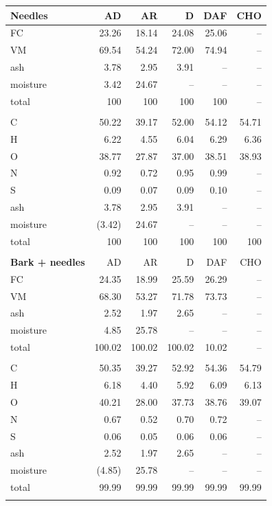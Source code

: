 \begin{center}
\begin{longtable}{lrrrrr}
    \textbf{Needles} & AD & AR & D & DAF & CHO \\
    \midrule
    FC       & 23.26  & 18.14  & 24.08  & 25.06  & -- \\
    VM       & 69.54  & 54.24  & 72.00  & 74.94  & -- \\
    ash      & 3.78   & 2.95   & 3.91   & --     & -- \\
    moisture & 3.42   & 24.67  & --     & --     & -- \\
    total    & 100    & 100    & 100    & 100    & -- \\
    \\
    C        & 50.22  & 39.17  & 52.00  & 54.12  & 54.71 \\
    H        & 6.22   & 4.55   & 6.04   & 6.29   & 6.36 \\
    O        & 38.77  & 27.87  & 37.00  & 38.51  & 38.93 \\
    N        & 0.92   & 0.72   & 0.95   & 0.99   & -- \\
    S        & 0.09   & 0.07   & 0.09   & 0.10   & -- \\
    ash      & 3.78   & 2.95   & 3.91   & --     & -- \\
    moisture & (3.42) & 24.67  & --     & --     & -- \\
    total    & 100    & 100    & 100    & 100    & 100 \\
    \\

    \textbf{Bark + needles} & AD & AR & D & DAF & CHO \\
    \midrule
    FC       & 24.35  & 18.99  & 25.59  & 26.29  & -- \\
    VM       & 68.30  & 53.27  & 71.78  & 73.73  & -- \\
    ash      & 2.52   & 1.97   & 2.65   & --     & -- \\
    moisture & 4.85   & 25.78  & --     & --     & -- \\
    total    & 100.02 & 100.02 & 100.02 & 10.02  & -- \\
    \\
    C        & 50.35  & 39.27  & 52.92  & 54.36  & 54.79 \\
    H        & 6.18   & 4.40   & 5.92   & 6.09   & 6.13 \\
    O        & 40.21  & 28.00  & 37.73  & 38.76  & 39.07 \\
    N        & 0.67   & 0.52   & 0.70   & 0.72   & -- \\
    S        & 0.06   & 0.05   & 0.06   & 0.06   & -- \\
    ash      & 2.52   & 1.97   & 2.65   & --     & -- \\
    moisture & (4.85) & 25.78  & --     & --     & -- \\
    total    & 99.99  & 99.99  & 99.99  & 99.99  & 99.99 \\
    \\


\end{longtable}
\end{center}
